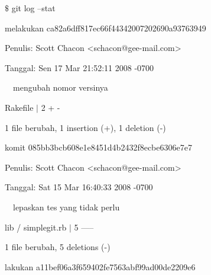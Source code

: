 \vspace{12pt}
\noindent 
 \hspace*{0.5in}  $  \$  $ git log --stat \par
\noindent 
 \hspace*{0.5in} melakukan ca82a6dff817ec66f44342007202690a93763949 \par
\noindent 
 \hspace*{0.5in} Penulis: Scott Chacon <schacon@gee-mail.com> \par
\noindent 
 \hspace*{0.5in} Tanggal: Sen 17 Mar 21:52:11 2008 -0700 \par
\vspace{12pt}
\noindent 
 \hspace*{0.5in}  $  $ $  $ $  $ $  $mengubah nomor versinya \par
\vspace{12pt}
\noindent 
 \hspace*{0.5in}  $  $Rakefile  $  \vert  $ 2 + - \par
\noindent 
 \hspace*{0.5in}  $  $1 file berubah, 1 insertion (+), 1 deletion (-) \par
\vspace{12pt}
\noindent 
 \hspace*{0.5in} komit 085bb3bcb608e1e8451d4b2432f8ecbe6306e7e7 \par
\noindent 
 \hspace*{0.5in} Penulis: Scott Chacon <schacon@gee-mail.com> \par
\noindent 
 \hspace*{0.5in} Tanggal: Sat 15 Mar 16:40:33 2008 -0700 \par
\vspace{12pt}
\noindent 
 \hspace*{0.5in}  $  $ $  $ $  $ $  $lepaskan tes yang tidak perlu \par
\vspace{12pt}
\noindent 
 \hspace*{0.5in}  $  $lib / simplegit.rb  $  \vert  $ 5 ----- \par
\noindent 
 \hspace*{0.5in}  $  $1 file berubah, 5 deletions (-) \par
\noindent 
 \hspace*{0.5in} \vspace{12pt}
\noindent 
 \hspace*{0.5in} lakukan a11bef06a3f659402fe7563abf99ad00de2209e6 \par
